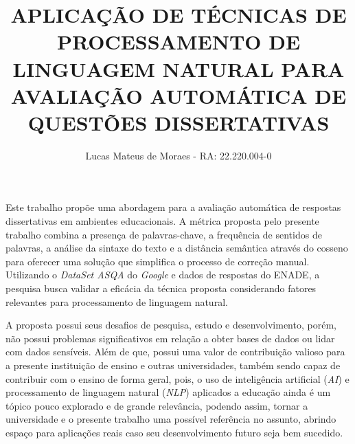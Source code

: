 \documentclass[acronym,symbols]{fei}
\author{
 Lucas Mateus de  Moraes - RA: 22.220.004-0
}
\title{APLICAÇÃO DE TÉCNICAS DE PROCESSAMENTO DE LINGUAGEM NATURAL PARA AVALIAÇÃO AUTOMÁTICA DE QUESTÕES DISSERTATIVAS}
\begin{document}
\maketitle 

\begin{resumo}

Este trabalho propõe uma abordagem para a avaliação automática de respostas dissertativas em ambientes educacionais. A métrica proposta pelo presente trabalho combina a presença de palavras-chave, a frequência de sentidos de palavras, a análise da sintaxe do texto e a distância semântica através do cosseno para oferecer uma solução que simplifica o processo de correção manual. Utilizando o \textit{DataSet ASQA} do \textit{Google} e dados de respostas do ENADE, a pesquisa busca validar a eficácia da técnica proposta considerando fatores relevantes para processamento de linguagem natural.

A proposta possui seus desafios de pesquisa, estudo e desenvolvimento, porém, não possui problemas significativos em relação a obter bases de dados ou lidar com dados sensíveis. Além de que, possui uma valor de contribuição valioso para a presente instituição de ensino e outras universidades, também sendo capaz de contribuir com o ensino de forma geral, pois, o uso de inteligência artificial (\textit{AI}) e processamento de linguagem natural (\textit{NLP}) aplicados a educação ainda é um tópico pouco explorado e de grande relevância, podendo assim, tornar a universidade e o presente trabalho uma possível referência no assunto, abrindo espaço para aplicações reais caso seu desenvolvimento futuro seja bem sucedido.


\end{resumo}
\end{document}
